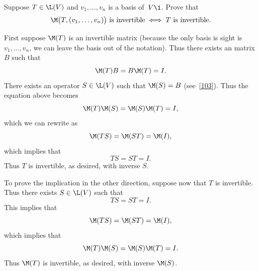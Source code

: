 \exercise
Suppose $T \in \L(V)$ and $v_1, \dots, v_n$ is a basis of~$V\1$.  Prove that
\[
\M\bigl(T, (v_1, \dots, v_n) \bigr) \text{ is invertible} \iff T \text{ is invertible}.
\]
\exercisedisplayend

\begin{Solution}
First suppose $\M(T)$ is an invertible matrix (because the only basis is
sight is $v_1, \dots, v_n$, we can leave the basis out of the notation).  Thus
there exists an  matrix $B$ such that
\[
\M(T) B = B \M(T) = I.
\]
There exists an operator $S \in \L(V)$ such that $\M(S) = B$ (see~\ref{103}).
Thus the equation above becomes
\[
\M(T) \M(S) = \M(S) \M(T) = I,
\]
which we can rewrite as
\[
\M(TS) = \M(ST) = \M(I),
\]
which implies that
\[
TS = ST = I.
\]
Thus $T$ is invertible, as desired, with inverse $S$.

To prove the implication in the other direction, suppose now that $T$ is
invertible.  Thus there exists $S \in \L(V)$ such that
\[
TS = ST = I.
\]
This implies that
\[
\M(TS) = \M(ST) = \M(I),
\]
which implies that
\[
\M(T) \M(S) = \M(S) \M(T) = I.
\]
Thus $\M(T)$ is invertible, as desired, with inverse $\M(S)$.
\end{Solution}

